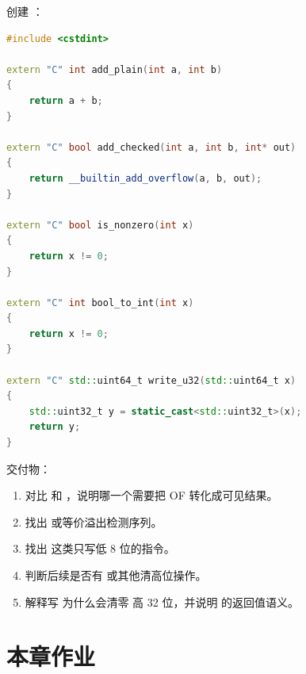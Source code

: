 \begin{labbox}
创建 ：

\begin{lstlisting}[language=C++]
#include <cstdint>

extern "C" int add_plain(int a, int b)
{
    return a + b;
}

extern "C" bool add_checked(int a, int b, int* out)
{
    return __builtin_add_overflow(a, b, out);
}

extern "C" bool is_nonzero(int x)
{
    return x != 0;
}

extern "C" int bool_to_int(int x)
{
    return x != 0;
}

extern "C" std::uint64_t write_u32(std::uint64_t x)
{
    std::uint32_t y = static_cast<std::uint32_t>(x);
    return y;
}
\end{lstlisting}

交付物：

\begin{enumerate}
  \item 对比  和 ，说明哪一个需要把 OF 转化成可见结果。
  \item 找出  或等价溢出检测序列。
  \item 找出  这类只写低 8 位的指令。
  \item 判断后续是否有  或其他清高位操作。
  \item 解释写  为什么会清零  高 32 位，并说明  的返回值语义。
\end{enumerate}
\end{labbox}

\section{本章作业}

